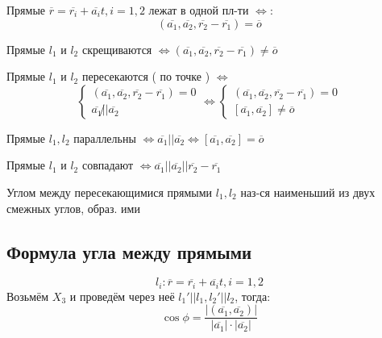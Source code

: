  \begin{consequence}
 Прямые $\overline{r} = \overline{r_i} + \overline{a_i}t, i = 1,2$ лежат в одной пл-ти $\iff$:
 \[
   (\overline{a_1}, \overline{a_2}, \overline{r_2} - \overline{r_1}) = \overline{o}
 \]
 \end{consequence}
 \begin{consequence}
 Прямые $l_1$ и $l_2$ скрещиваются $\iff (\overline{a_1}, \overline{a_2}, \overline{r_2} - \overline{r_1}) \neq \overline{o}$
 \end{consequence}
 \begin{consequence}
 Прямые $l_1$ и $l_2$ пересекаются ( по точке ) $\iff$
 \[
 \begin{cases}
   (\overline{a_1}, \overline{a_2}, \overline{r_2} - \overline{r_1}) = 0 \\
   \overline{a_1} \not|| \overline{a_2}
 \end{cases} \iff
 \begin{cases}
   (\overline{a_1}, \overline{a_2}, \overline{r_2} - \overline{r_1}) = 0 \\
   [\overline{a_1}, \overline{a_2}] \neq \overline{o}
 \end{cases}
 \]
 \end{consequence}
 \begin{consequence}
 Прямые $l_1, l_2$ параллельны $\iff \overline{a_1} || \overline{a_2} \iff [\overline{a_1}, \overline{a_2}] = \overline{o}$ 
 \end{consequence}
 \begin{consequence}
 Прямые $l_1$ и $l_2$ совпадают $\iff \overline{a_1} || \overline{a_2} || \overline{r_2} - \overline{r_1}$
 \end{consequence}
 \begin{definition}
 Углом между пересекающимися прямыми $l_1, l_2$ наз-ся наименьший из двух смежных углов, образ. ими 
 \end{definition}
\subsection{Формула угла между прямыми}
\[
  l_i\colon \overline{r} = \overline{r_i} + \overline{a_i}t, i = 1, 2
\]
Возьмём $X_3$ и проведём через неё $l_1' || l_1, l_2' || l_2$, тогда:
\[
\cos \phi = \frac{|(\overline{a_1}, \overline{a_2})|}{\left|\overline{a_1}\right| \cdot \left|\overline{a_2}\right|}
\]
